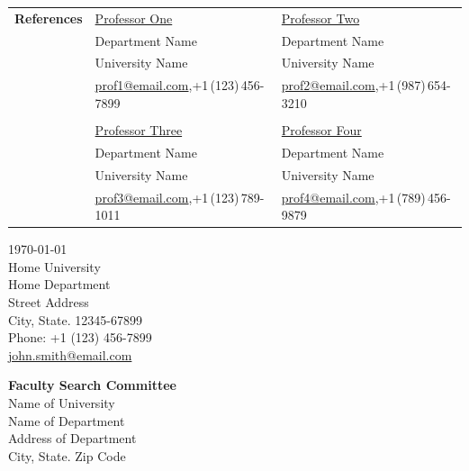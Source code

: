 \documentclass[letterpaper, 9pt,oneside]{article}
\begin{document}
\noindent \begin{tabular}{@{} l l l}
\textbf{References} & \href{http://www.professorone.com}{Professor One} & \href{http://www.professortwo.com}{Professor Two} \\
& Department Name &  Department Name  \\
& University Name &  University Name \\
& \small{\href{mailto:prof1@email.com}{prof1@email.com},+1\,(123)\,456-7899} & \small{\href{mailto:prof2@email.com}{prof2@email.com},+1\,(987)\,654-3210} \\
&& \\
& \href{http://www.professorthree.com}{Professor Three} & \href{http://www.professorfour.com}{Professor Four}  \\
& Department Name &  Department Name \\
& University Name &  University Name \\
& \small{\href{mailto:prof3@email.com}{prof3@email.com},+1\,(123)\,789-1011} & \small{\href{mailto:prof4@email.com}{prof4@email.com},+1\,(789)\,456-9879} \\
\end{tabular}



\clearpage
\setlength\parindent{0cm}



\begin{flushright}
	\today                           \\
	\vspace{1em}
	Home University            \\
	Home Department                  \\
	Street Address                       \\
	City, State. 12345-67899   \\
	Phone: +1 (123) 456-7899         \\
	\href{mailto:john.smith@email.com}{john.smith@email.com}  \\ %
\end{flushright}


\begin{flushleft}
	\textbf{Faculty Search Committee}         \\
	Name of University \\
	Name of Department                  \\
	Address of Department \\
	City, State. Zip Code
\end{flushleft}
\end{document}
